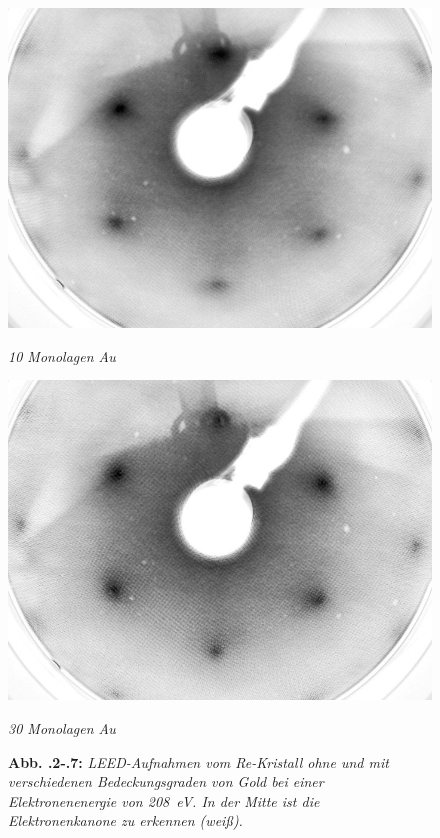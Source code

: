\begin{figure}[H]
	\begin{minipage}[b]{0.5\textwidth} 
		\includegraphics[width=\textwidth]{LEED-Bilder/bearbeitet/10ML_E207}
		\caption{\textit{10 Monolagen Au}}
		\label{10ML} 
	\end{minipage}
	\hfill
	\begin{minipage}[b]{0.5\textwidth}
		\includegraphics[width=\textwidth]{LEED-Bilder/bearbeitet/30ML_E208}
		\caption{\textit{30 Monolagen Au}}
		\label{30ML} 
	\end{minipage}
	\caption*{\textbf{Abb. \thechapter.2-\thechapter.7:} \textit{LEED-Aufnahmen vom Re-Kristall ohne
	und mit verschiedenen Bedeckungsgraden von Gold bei einer Elektronenenergie von \SI{208}{eV}. In
	der Mitte ist die Elektronenkanone zu erkennen (weiß).}}
\end{figure}


